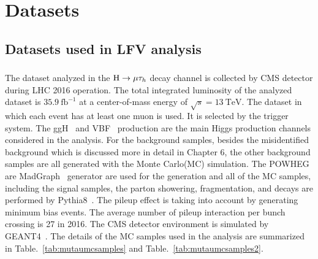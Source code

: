 
\chapter{Datasets}
\section{Datasets used in LFV analysis}
\subsection{\Hmuhad}
The dataset analyzed in the $\mathrm{H}\to \mu\tau_{h}$ decay channel is collected by CMS detector during LHC 2016 operation. The total integrated luminosity of the analyzed dataset is $35.9 ~\textrm{fb}^{-1} $ at a center-of-mass energy of $ \sqrt{s}=13 ~\textrm{TeV} $. The dataset in which each event has at least one muon is used. It is selected by the trigger system. The ggH~\cite{Georgi:1977gs} and VBF~\cite{Cahn:1986zv} production are the main Higgs production channels considered in the analysis. For the background samples, besides the misidentified background which is discussed more in detail in Chapter 6, the other background samples are all generated with the Monte Carlo(MC) simulation. The POWHEG~\cite{POWHEG-BOX} are MadGraph~\cite{Alwall:2014} generator are used for the generation and all of the MC samples, including the signal samples, the parton showering, fragmentation, and decays are performed by Pythia8~\cite{Sjostrand:2014zea}.  The pileup effect is taking into account by generating minimum bias events. The average number of pileup interaction per bunch crossing is 27 in 2016. The CMS detector environment is simulated by GEANT4~\cite{GEANT4}. The details of the MC samples used in the analysis are summarized in Table.~\ref{tab:mutaumcsamples} and Table.~\ref{tab:mutaumcsamples2}.

